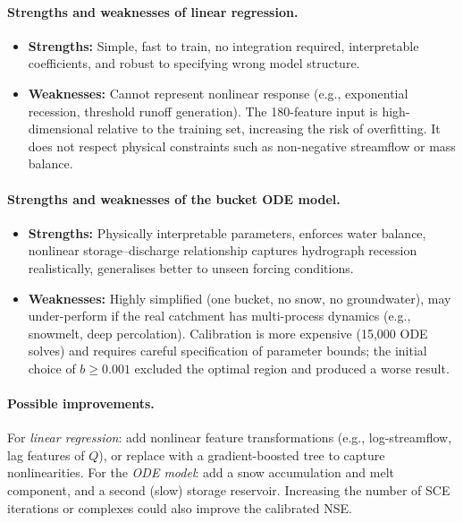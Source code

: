 \documentclass[11pt,letterpaper]{article}
\begin{document}
\paragraph{Strengths and weaknesses of linear regression.}
\begin{itemize}
    \item \textbf{Strengths:} Simple, fast to train, no integration required, interpretable coefficients, and robust to specifying wrong model structure.
    \item \textbf{Weaknesses:} Cannot represent nonlinear response (e.g., exponential recession, threshold runoff generation). The 180-feature input is high-dimensional relative to the training set, increasing the risk of overfitting. It does not respect physical constraints such as non-negative streamflow or mass balance.
\end{itemize}

\paragraph{Strengths and weaknesses of the bucket ODE model.}
\begin{itemize}
    \item \textbf{Strengths:} Physically interpretable parameters, enforces water balance, nonlinear storage--discharge relationship captures hydrograph recession realistically, generalises better to unseen forcing conditions.
    \item \textbf{Weaknesses:} Highly simplified (one bucket, no snow, no groundwater), may under-perform if the real catchment has multi-process dynamics (e.g., snowmelt, deep percolation). Calibration is more expensive (15{,}000 ODE solves) and requires careful specification of parameter bounds; the initial choice of $b \geq 0.001$ excluded the optimal region and produced a worse result.
\end{itemize}

\paragraph{Possible improvements.}
For \emph{linear regression}: add nonlinear feature transformations (e.g., log-streamflow, lag features of $Q$), or replace with a gradient-boosted tree to capture nonlinearities. For the \emph{ODE model}: add a snow accumulation and melt component, and a second (slow) storage reservoir. Increasing the number of SCE iterations or complexes could also improve the calibrated NSE.
\end{document}
